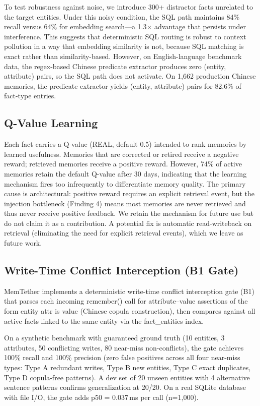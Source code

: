 \documentclass[11pt]{article}
\begin{document}
To test robustness against noise, we introduce 300+ distractor facts unrelated to the target entities. Under this noisy condition, the SQL path maintains 84\% recall versus 64\% for embedding search---a 1.3$\times$ advantage that persists under interference. This suggests that deterministic SQL routing is robust to context pollution in a way that embedding similarity is not, because SQL matching is exact rather than similarity-based. However, on English-language benchmark data, the regex-based Chinese predicate extractor produces zero (entity, attribute) pairs, so the SQL path does not activate. On 1{,}662 production Chinese memories, the predicate extractor yields (entity, attribute) pairs for 82.6\% of fact-type entries.




\subsection{Q-Value Learning}
Each fact carries a Q-value (REAL, default 0.5) intended to rank memories by learned usefulness. Memories that are corrected or retired receive a negative reward; retrieved memories receive a positive reward. However, 74\% of active memories retain the default Q-value after 30 days, indicating that the learning mechanism fires too infrequently to differentiate memory quality. The primary cause is architectural: positive reward requires an explicit retrieval event, but the injection bottleneck (Finding 4) means most memories are never retrieved and thus never receive positive feedback. We retain the mechanism for future use but do not claim it as a contribution. A potential fix is automatic read-writeback on retrieval (eliminating the need for explicit retrieval events), which we leave as future work.

\subsection{Write-Time Conflict Interception (B1 Gate)}

MemTether implements a deterministic write-time conflict interception gate (B1) that parses each incoming remember() call for attribute--value assertions of the form entity attr is value (Chinese copula construction), then compares against all active facts linked to the same entity via the fact\_entities index.

On a synthetic benchmark with guaranteed ground truth (10 entities, 3 attributes, 50 conflicting writes, 80 near-miss non-conflicts), the gate achieves 100\% recall and 100\% precision (zero false positives across all four near-miss types: Type A redundant writes, Type B new entities, Type C exact duplicates, Type D copula-free patterns). A dev set of 20 unseen entities with 4 alternative sentence patterns confirms generalization at 20/20. On a real SQLite database with file I/O, the gate adds p50 = 0.037\,ms per call (n=1,000).
\end{document}

